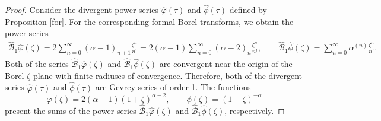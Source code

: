 \documentclass[10pt,a4paper]{article}
\numberwithin{equation}{section}
\begin{document}
 \begin{proof}
 Consider the divergent power series $\hat{\varphi}(\tau)$ and $\hat{\phi}(\tau)$ defined by Proposition \ref{for}. For the corresponding
 formal Borel transforms, we obtain the power series
 \begin{gather*}
 \hat{\mathcal{B}}_1 \hat{\varphi}(\zeta)
 =
 2 \sum_{n=0}^{\infty} (\alpha-1)_{n+1} \frac{\zeta^n}{n!}=
 2 (\alpha-1) \sum_{n=0}^{\infty} (\alpha-2)_n \frac{\zeta^n}{n!},\qquad
 \hat{\mathcal{B}}_1 \hat{\phi}(\zeta)
 =
 \sum_{n=0}^{\infty} \alpha^{(n)} \frac{\zeta^n}{n!} .
 \end{gather*}
 Both of the series $\hat{\mathcal{B}}_1 \hat{\varphi}(\zeta)$ and $\hat{\mathcal{B}}_1 \hat{\phi}(\zeta)$ are convergent near the origin
 of the Borel $\zeta$-plane with finite radiuses of convergence. Therefore, both of the divergent series $\hat{\varphi}(\tau)$
 and $\hat{\phi}(\tau)$ are Gevrey series of order 1. The functions
 \[
 \varphi(\zeta)=2 (\alpha-1) (1+\zeta)^{\alpha-2},\qquad
 \phi(\zeta)=(1-\zeta)^{-\alpha}
 \]
 present the sums of the power series $\hat{\mathcal{B}}_1 \hat{\varphi}(\zeta)$ and $\hat{\mathcal{B}}_1 \hat{\phi}(\zeta)$, respectively.


\end{proof}
\end{document}
